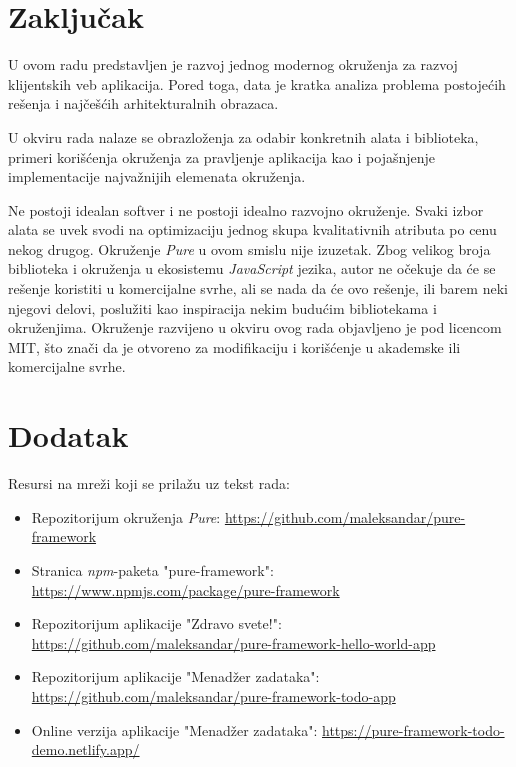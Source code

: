 \documentclass[12pt,oneside]{memoir}
\begin{document}
\chapter{Zaključak}\label{chap:zakljucak}

U ovom radu predstavljen je razvoj jednog modernog okruženja za razvoj klijentskih veb aplikacija. Pored toga, data je kratka analiza problema postojećih rešenja i najčešćih arhitekturalnih obrazaca.

U okviru rada nalaze se obrazloženja za odabir konkretnih alata i biblioteka, primeri korišćenja okruženja za pravljenje aplikacija kao i pojašnjenje implementacije najvažnijih elemenata okruženja.

Ne postoji idealan softver i ne postoji idealno razvojno okruženje. Svaki izbor alata se uvek svodi na optimizaciju jednog skupa kvalitativnih atributa po cenu nekog drugog. Okruženje \emph{Pure} u ovom smislu nije izuzetak.
Zbog velikog broja biblioteka i okruženja u ekosistemu \emph{JavaScript} jezika, autor ne očekuje da će se rešenje koristiti u komercijalne svrhe,
ali se nada da će ovo rešenje, ili barem neki njegovi delovi, poslužiti kao inspiracija nekim budućim bibliotekama i okruženjima.
Okruženje razvijeno u okviru ovog rada objavljeno je pod licencom MIT, što znači da je otvoreno za modifikaciju i korišćenje u akademske ili komercijalne svrhe.


\chapter{Dodatak}
Resursi na mreži koji se prilažu uz tekst rada:
\begin{itemize}
  \item Repozitorijum okruženja \emph{Pure}: \url{https://github.com/maleksandar/pure-framework}
  \item Stranica \emph{npm}-paketa "pure-framework": \url{https://www.npmjs.com/package/pure-framework}
  \item Repozitorijum aplikacije "Zdravo svete!": \url{https://github.com/maleksandar/pure-framework-hello-world-app}
  \item Repozitorijum aplikacije "Menadžer zadataka": \url{https://github.com/maleksandar/pure-framework-todo-app}
  \item Online verzija aplikacije "Menadžer zadataka": \url{https://pure-framework-todo-demo.netlify.app/}
\end{itemize}
\literatura
\end{document}
